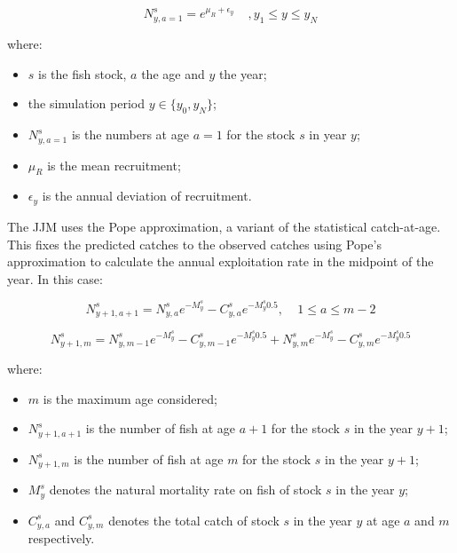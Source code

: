 \documentclass{article}
\begin{document}
\begin{equation}
N^s_{y,a=1}=e^{\mu_R+\epsilon_{y}}  \ \ \ \ \ , y_{1}\leq y \leq y_{N}
\end{equation}

where:
\begin{itemize}
    \item $s$ is the fish stock, $a$ the age and $y$ the year;
    
    \item the simulation period ${y \in \{y_{0},y_{N}\}}$;

    \item $N^s_{y,a=1}$ is the numbers at age $a=1$ for the stock $s$ in year $y$;
    
    \item $\mu_R$ is the mean recruitment;

    \item $\epsilon_{y}$ is the annual deviation of recruitment.
    
\end{itemize}

The JJM uses the Pope approximation, a variant of the statistical catch-at-age. This fixes the predicted catches to the observed catches using Pope's approximation to calculate the annual exploitation rate in the midpoint of the year. In this case:

\begin{equation}
N^{s}_{y+1,a+1}=N^s_{y,a}e^{-M^s_y}-C^s_{y,a}e^{-M^s_y 0.5}, \ \ \ \ \ 1\leq a \leq m-2
\end{equation}
    
\begin{equation}
N^s_{y+1,m}=N^s_{y,m-1}e^{-M^s_y}-C^s_{y,m-1}e^{-M^s_y 0.5}+N^s_{y,m}e^{-M^s_y}-C^s_{y,m}e^{-M^s_y 0.5}
\end{equation}

where:
\begin{itemize}
    \item $m$ is the maximum age considered;
    
    \item $N^{s}_{y+1,a+1}$ is the number of fish at age $a+1$ for the stock $s$ in the year $y+1$;

    \item $N^{s}_{y+1,m}$ is the number of fish at age $m$ for the stock $s$ in the year $y+1$;

    \item $M^{s}_{y}$ denotes the natural mortality rate on fish of stock $s$ in the year $y$;

    \item $C^s_{y,a}$ and $C^s_{y,m}$ denotes the total catch of stock $s$ in the year $y$ at age $a$ and $m$ respectively.
    
\end{itemize}
\end{document}
